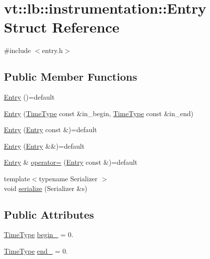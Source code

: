 \hypertarget{structvt_1_1lb_1_1instrumentation_1_1_entry}{}\section{vt\+:\+:lb\+:\+:instrumentation\+:\+:Entry Struct Reference}
\label{structvt_1_1lb_1_1instrumentation_1_1_entry}


{\ttfamily \#include $<$entry.\+h$>$}

\subsection*{Public Member Functions}
\begin{DoxyCompactItemize}
\item 
\hyperlink{structvt_1_1lb_1_1instrumentation_1_1_entry_a37fff1fbfc8ea409823ddf80a99ba6ff}{Entry} ()=default
\item 
\hyperlink{structvt_1_1lb_1_1instrumentation_1_1_entry_a8f4f3bee10ab8b4f0adeca9ca9be2c8f}{Entry} (\hyperlink{namespacevt_a876a9d0cd5a952859c72de8a46881442}{Time\+Type} const \&in\+\_\+begin, \hyperlink{namespacevt_a876a9d0cd5a952859c72de8a46881442}{Time\+Type} const \&in\+\_\+end)
\item 
\hyperlink{structvt_1_1lb_1_1instrumentation_1_1_entry_a3f2caf53f26067d58705c8c01c9d483b}{Entry} (\hyperlink{structvt_1_1lb_1_1instrumentation_1_1_entry}{Entry} const \&)=default
\item 
\hyperlink{structvt_1_1lb_1_1instrumentation_1_1_entry_a659525a81bbcf2b9269e53628216733f}{Entry} (\hyperlink{structvt_1_1lb_1_1instrumentation_1_1_entry}{Entry} \&\&)=default
\item 
\hyperlink{structvt_1_1lb_1_1instrumentation_1_1_entry}{Entry} \& \hyperlink{structvt_1_1lb_1_1instrumentation_1_1_entry_ad67e675730870f91a9e1c975637e81bc}{operator=} (\hyperlink{structvt_1_1lb_1_1instrumentation_1_1_entry}{Entry} const \&)=default
\item 
{\footnotesize template$<$typename Serializer $>$ }\\void \hyperlink{structvt_1_1lb_1_1instrumentation_1_1_entry_a12c76ed3b4a19b7cc1be61725c40b57f}{serialize} (Serializer \&s)
\end{DoxyCompactItemize}
\subsection*{Public Attributes}
\begin{DoxyCompactItemize}
\item 
\hyperlink{namespacevt_a876a9d0cd5a952859c72de8a46881442}{Time\+Type} \hyperlink{structvt_1_1lb_1_1instrumentation_1_1_entry_a8e74c3f09fa8b430a2880e9f844dd47a}{begin\+\_\+} = 0.
\item 
\hyperlink{namespacevt_a876a9d0cd5a952859c72de8a46881442}{Time\+Type} \hyperlink{structvt_1_1lb_1_1instrumentation_1_1_entry_ae2e12daef2bee2265c18d5b87815675f}{end\+\_\+} = 0.
\end{DoxyCompactItemize}


